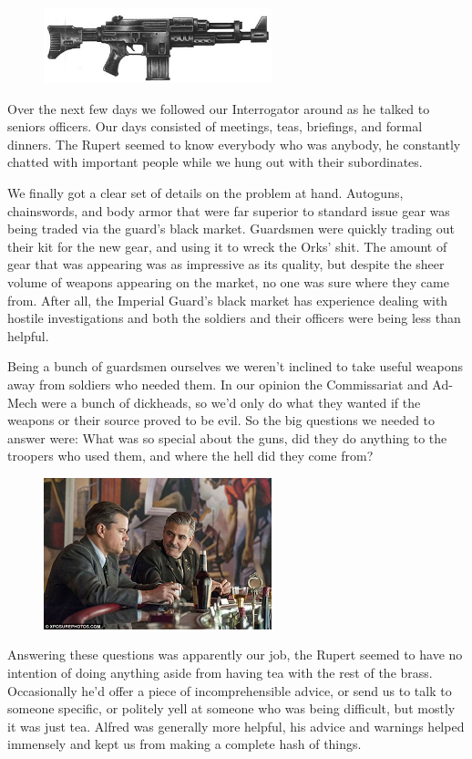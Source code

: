 \begin{figure}
	\begin{center}
		\includegraphics[width=\figwidth]{pics/4/8.png}
	\end{center}
\end{figure}
Over the next few days we followed our Interrogator around as he talked to seniors officers. 
Our days consisted of meetings, teas, briefings, and formal dinners.
The Rupert seemed to know everybody who was anybody, he constantly chatted with important people while we hung out with their subordinates.

We finally got a clear set of details on the problem at hand. 
Autoguns, chainswords, and body armor that were far superior to standard issue gear was being traded via the guard's black market. 
Guardsmen were quickly trading out their kit for the new gear, and using it to wreck the Orks' shit. %
The amount of gear that was appearing was as impressive as its quality, but despite the sheer volume of weapons appearing on the market, no one was sure where they came from. 
After all, the Imperial Guard's black market has experience dealing with hostile investigations and both the soldiers and their officers were being less than helpful.

Being a bunch of guardsmen ourselves we weren't inclined to take useful weapons away from soldiers who needed them. 
In our opinion the Commissariat and Ad-Mech were a bunch of dickheads, so we'd only do what they wanted if the weapons or their source proved to be evil. 
So the big questions we needed to answer were: 
What was so special about the guns, did they do anything to the troopers who used them, and where the hell did they come from?

\begin{figure}
	\begin{center}
		\includegraphics[width=\figwidth]{pics/4/9.png}
	\end{center}
\end{figure}
Answering these questions was apparently our job, the Rupert seemed to have no intention of doing anything aside from having tea with the rest of the brass.
Occasionally he'd offer a piece of incomprehensible advice, or send us to talk to someone specific, or politely yell at someone who was being difficult, but mostly it was just tea. 
Alfred was generally more helpful, his advice and warnings helped immensely and kept us from making a complete hash of things.

